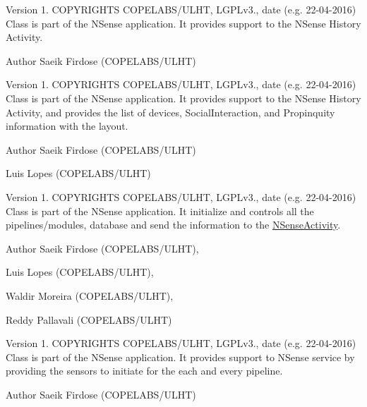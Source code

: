 \begin{DoxyVersion}{Version}
1. C\-O\-P\-Y\-R\-I\-G\-H\-T\-S C\-O\-P\-E\-L\-A\-B\-S/\-U\-L\-H\-T, L\-G\-P\-Lv3., date (e.\-g. 22-\/04-\/2016) Class is part of the N\-Sense application. It provides support to the N\-Sense History Activity. 
\end{DoxyVersion}
\begin{DoxyAuthor}{Author}
Saeik Firdose (C\-O\-P\-E\-L\-A\-B\-S/\-U\-L\-H\-T)
\end{DoxyAuthor}
\begin{DoxyVersion}{Version}
1. C\-O\-P\-Y\-R\-I\-G\-H\-T\-S C\-O\-P\-E\-L\-A\-B\-S/\-U\-L\-H\-T, L\-G\-P\-Lv3., date (e.\-g. 22-\/04-\/2016) Class is part of the N\-Sense application. It provides support to the N\-Sense History Activity, and provides the list of devices, Social\-Interaction, and Propinquity information with the layout. 
\end{DoxyVersion}
\begin{DoxyAuthor}{Author}
Saeik Firdose (C\-O\-P\-E\-L\-A\-B\-S/\-U\-L\-H\-T) 

Luis Lopes (C\-O\-P\-E\-L\-A\-B\-S/\-U\-L\-H\-T)
\end{DoxyAuthor}
\begin{DoxyVersion}{Version}
1. C\-O\-P\-Y\-R\-I\-G\-H\-T\-S C\-O\-P\-E\-L\-A\-B\-S/\-U\-L\-H\-T, L\-G\-P\-Lv3., date (e.\-g. 22-\/04-\/2016) Class is part of the N\-Sense application. It initialize and controls all the pipelines/modules, database and send the information to the \hyperlink{classcs_1_1nsense_1_1_n_sense_activity}{N\-Sense\-Activity}. 
\end{DoxyVersion}
\begin{DoxyAuthor}{Author}
Saeik Firdose (C\-O\-P\-E\-L\-A\-B\-S/\-U\-L\-H\-T), 

Luis Lopes (C\-O\-P\-E\-L\-A\-B\-S/\-U\-L\-H\-T), 

Waldir Moreira (C\-O\-P\-E\-L\-A\-B\-S/\-U\-L\-H\-T), 

Reddy Pallavali (C\-O\-P\-E\-L\-A\-B\-S/\-U\-L\-H\-T)
\end{DoxyAuthor}
\begin{DoxyVersion}{Version}
1. C\-O\-P\-Y\-R\-I\-G\-H\-T\-S C\-O\-P\-E\-L\-A\-B\-S/\-U\-L\-H\-T, L\-G\-P\-Lv3., date (e.\-g. 22-\/04-\/2016) Class is part of the N\-Sense application. It provides support to N\-Sense service by providing the sensors to initiate for the each and every pipeline. 
\end{DoxyVersion}
\begin{DoxyAuthor}{Author}
Saeik Firdose (C\-O\-P\-E\-L\-A\-B\-S/\-U\-L\-H\-T)
\end{DoxyAuthor}
